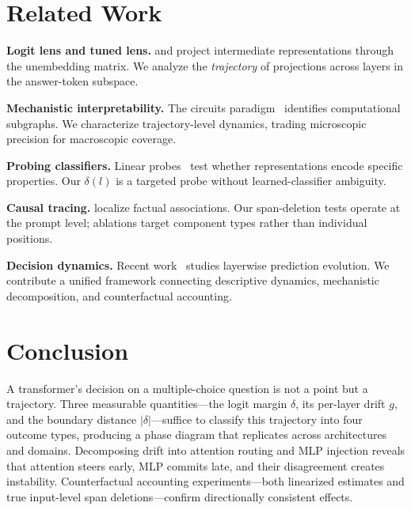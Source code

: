\documentclass{article}
\begin{document}
\section{Related Work}

\textbf{Logit lens and tuned lens.}  \citet{nostalgebraist2020} and \citet{belrose2023} project intermediate representations through the unembedding matrix.  We analyze the \emph{trajectory} of projections across layers in the answer-token subspace.

\textbf{Mechanistic interpretability.}  The circuits paradigm~\cite{elhage2021,olsson2022,conmy2023} identifies computational subgraphs.  We characterize trajectory-level dynamics, trading microscopic precision for macroscopic coverage.

\textbf{Probing classifiers.}  Linear probes~\cite{belinkov2022,hewitt2019} test whether representations encode specific properties.  Our $\delta(l)$ is a targeted probe without learned-classifier ambiguity.

\textbf{Causal tracing.}  \citet{meng2022} localize factual associations.  Our span-deletion tests operate at the prompt level; ablations target component types rather than individual positions.

\textbf{Decision dynamics.}  Recent work~\cite{din2023,geva2023} studies layerwise prediction evolution.  We contribute a unified framework connecting descriptive dynamics, mechanistic decomposition, and counterfactual accounting.


\section{Conclusion}

A transformer's decision on a multiple-choice question is not a point but a trajectory.  Three measurable quantities---the logit margin $\delta$, its per-layer drift $g$, and the boundary distance $|\delta|$---suffice to classify this trajectory into four outcome types, producing a phase diagram that replicates across architectures and domains.  Decomposing drift into attention routing and MLP injection reveals that attention steers early, MLP commits late, and their disagreement creates instability.  Counterfactual accounting experiments---both linearized estimates and true input-level span deletions---confirm directionally consistent effects.
\end{document}
